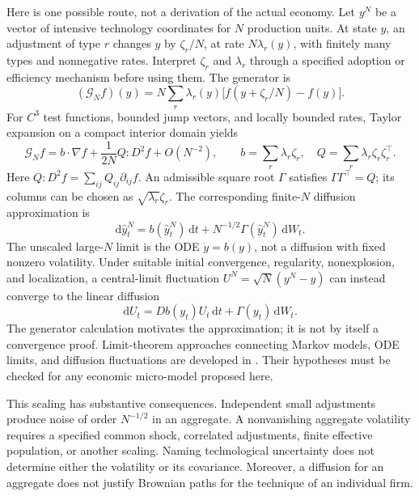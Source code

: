 \documentclass[11pt,letterpaper]{article}
\begin{document}
Here is one possible route, not a derivation of the actual economy.
Let $y^N$ be a vector of intensive technology coordinates for $N$
production units. At state $y$, an adjustment of type $r$ changes
$y$ by $\zeta_r/N$, at rate $N\lambda_r(y)$, with finitely many types
and nonnegative rates. Interpret $\zeta_r$ and $\lambda_r$ through a
specified adoption or efficiency mechanism before using them. The
generator is
\begin{equation}\label{eq:microtech}
 (\mathcal G_N f)(y)=
 N\sum_r\lambda_r(y)\bigl[f(y+\zeta_r/N)-f(y)\bigr].
\end{equation}
For $C^3$ test functions, bounded jump vectors, and locally bounded
rates, Taylor expansion on a compact interior domain yields
\begin{equation}\label{eq:generator-expansion}
 \mathcal G_N f
 =b\cdot\nabla f+\frac{1}{2N}Q:D^2f+O(N^{-2}),\qquad
 b=\sum_r\lambda_r\zeta_r,\quad
 Q=\sum_r\lambda_r\zeta_r\zeta_r^\top .
\end{equation}
Here $Q:D^2f=\sum_{ij}Q_{ij}\partial_{ij}f$. An admissible square root
$\Gamma$ satisfies $\Gamma\Gamma^\top=Q$; its columns can be chosen as
$\sqrt{\lambda_r}\zeta_r$. The corresponding finite-$N$ diffusion
approximation is
\begin{equation}\label{eq:technology-approximation}
 \mathrm d\widehat y^N_t=b(\widehat y^N_t)\,\mathrm dt
       +N^{-1/2}\Gamma(\widehat y^N_t)\,\mathrm dW_t.
\end{equation}
The unscaled large-$N$ limit is the ODE $\dot y=b(y)$, not a diffusion
with fixed nonzero volatility. Under suitable initial convergence,
regularity, nonexplosion, and localization, a central-limit fluctuation
$U^N=\sqrt N(y^N-y)$ can instead converge to the linear diffusion
\[
 \mathrm dU_t=Db(y_t)U_t\,\mathrm dt+\Gamma(y_t)\,\mathrm dW_t.
\]
The generator calculation motivates the approximation; it is not by
itself a convergence proof. Limit-theorem approaches connecting Markov
models, ODE limits, and diffusion fluctuations are developed in
\cite{kang-kurtz-popovic}. Their hypotheses must be checked for any
economic micro-model proposed here.

This scaling has substantive consequences. Independent small adjustments
produce noise of order $N^{-1/2}$ in an aggregate. A nonvanishing
aggregate volatility requires a specified common shock, correlated
adjustments, finite effective population, or another scaling. Naming
technological uncertainty does not determine either the volatility or
its covariance. Moreover, a diffusion for an aggregate does not justify
Brownian paths for the technique of an individual firm.
\end{document}
